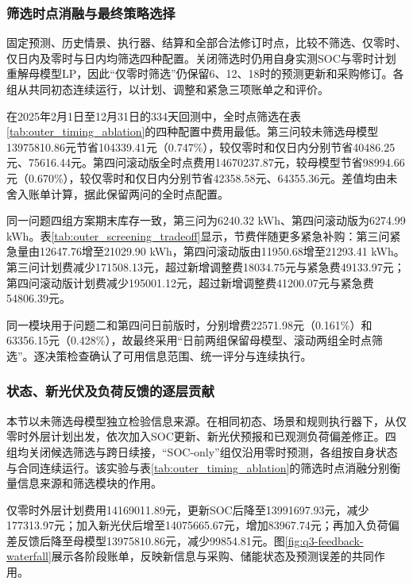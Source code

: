 \subsubsection{筛选时点消融与最终策略选择}
\label{sec:q3_screening_ablation}

固定预测、历史情景、执行器、结算和全部合法修订时点，比较不筛选、仅零时、仅日内及零时与日内均筛选四种配置。关闭筛选时仍用自身实测SOC与零时计划重解母模型LP，因此“仅零时筛选”仍保留6、12、18时的预测更新和采购修订。各组从共同初态连续运行，以计划、调整和紧急三项账单之和评价。



在2025年2月1日至12月31日的334天回测中，全时点筛选在表\ref{tab:outer_timing_ablation}的四种配置中费用最低。第三问较未筛选母模型13975810.86元节省104339.41元（0.747\%），较仅零时和仅日内分别节省40486.25元、75616.44元。第四问滚动版全时点费用14670237.87元，较母模型节省98994.66元（0.670\%），较仅零时和仅日内分别节省42358.58元、64355.36元。差值均由未舍入账单计算，据此保留两问的全时点配置。



同一问题四组方案期末库存一致，第三问为6240.32 kWh、第四问滚动版为6274.99 kWh。表\ref{tab:outer_screening_tradeoff}显示，节费伴随更多紧急补购：第三问紧急量由12647.76增至21029.90 kWh，第四问滚动版由11950.68增至21293.41 kWh。第三问计划费减少171508.13元，超过新增调整费18034.75元与紧急费49133.97元；第四问滚动版计划费减少195001.12元，超过新增调整费41200.07元与紧急费54806.39元。

同一模块用于问题二和第四问日前版时，分别增费22571.98元（0.161\%）和63356.15元（0.428\%），故最终采用“日前两组保留母模型、滚动两组全时点筛选”。逐决策检查确认了可用信息范围、统一评分与连续执行。

\subsubsection{状态、新光伏及负荷反馈的逐层贡献}

本节以未筛选母模型独立检验信息来源。在相同初态、场景和规则执行器下，从仅零时外层计划出发，依次加入SOC更新、新光伏预报和已观测负荷偏差修正。四组均关闭候选筛选与跨日续接，“SOC-only”组仅沿用零时预测，各组按自身状态与合同连续运行。该实验与表\ref{tab:outer_timing_ablation}的筛选时点消融分别衡量信息来源和筛选模块的作用。



仅零时外层计划费用14169011.89元，更新SOC后降至13991697.93元，减少177313.97元；加入新光伏后增至14075665.67元，增加83967.74元；再加入负荷偏差反馈后降至母模型13975810.86元，减少99854.81元。图\ref{fig:q3-feedback-waterfall}展示各阶段账单，反映新信息与采购、储能状态及预测误差的共同作用。

